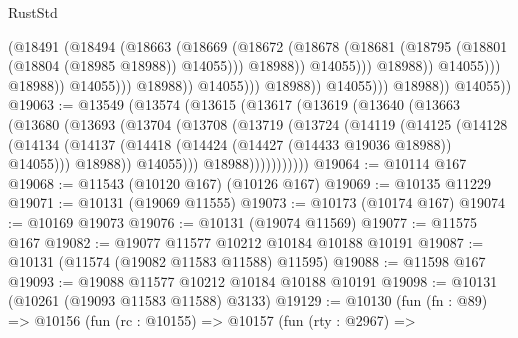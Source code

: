 \begin{lexlean}{RustStd}
\begin{coremodule}
                                                  (@18491
                                                    (@18494
                                                      (@18663
                                                        (@18669
                                                          (@18672
                                                            (@18678
                                                              (@18681
                                                                (@18795
                                                                  (@18801
                                                                    (@18804 (@18985 @18988))
                                                                    @14055)))
                                                              @18988))
                                                          @14055)))
                                                    @18988))
                                                @14055)))
                                          @18988))
                                      @14055)))
                                @18988))
                            @14055)))
                      @18988))
                  @14055)))
            @18988))
        @14055))
@19063 := @13549
    (@13574
      (@13615
        (@13617
          (@13619
            (@13640
              (@13663
                (@13680
                  (@13693
                    (@13704
                      (@13708
                        (@13719
                          (@13724
                            (@14119
                              (@14125
                                (@14128
                                  (@14134
                                    (@14137
                                      (@14418 (@14424 (@14427 (@14433 @19036 @18988)) @14055)))
                                    @18988))
                                @14055)))
                          @18988)))))))))))
@19064 := @10114 @167
@19068 := @11543 (@10120 @167) (@10126 @167)
@19069 := @10135 @11229
@19071 := @10131 (@19069 @11555)
@19073 := @10173 (@10174 @167)
@19074 := @10169 @19073
@19076 := @10131 (@19074 @11569)
@19077 := @11575 @167
@19082 := @19077 @11577 @10212 @10184 @10188 @10191
@19087 := @10131 (@11574 (@19082 @11583 @11588) @11595)
@19088 := @11598 @167
@19093 := @19088 @11577 @10212 @10184 @10188 @10191
@19098 := @10131 (@10261 (@19093 @11583 @11588) @3133)
@19129 := @10130
    (fun (fn : @89) =>
    @10156
      (fun (rc : @10155) =>
      @10157
        (fun (rty : @2967) =>

\end{coremodule}
\end{lexlean}
